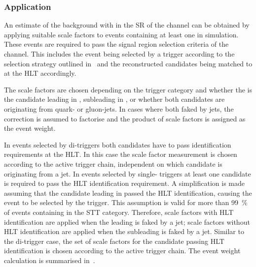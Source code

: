 \subsubsection{Application}

An estimate of the \ttbar background with \faketauhadvis in the SR of
the \hadhad channel can be obtained by applying suitable scale factors
to events containing at least one \faketauhadvis in \ttbar simulation.
These events are required to pass the signal region selection criteria
of the \hadhad channel. This includes the event being selected by a
trigger according to the selection strategy outlined
in~ and the reconstructed \tauhadvis candidates
being matched to \tauhadvis at the HLT accordingly.

The scale factors are chosen depending on the trigger category and
whether the \faketauhadvis is the \tauhadvis candidate leading in \pT,
subleading in \pT, or whether both candidates are originating from
quark- or gluon-jets. In cases where both \tauhadvis faked by jets,
the correction is assumed to factorise and the product of scale
factors is assigned as the event weight.

In events selected by di-\tauhadvis triggers both \tauhadvis
candidates have to pass identification requirements at the HLT. In
this case the scale factor measurement is chosen according to the
active trigger chain, independent on which \tauhadvis candidate is
originating from a jet. In events selected by single-\tauhadvis
triggers at least one \tauhadvis candidate is required to pass the
HLT \tauhadvis identification requirement. A simplification is made
assuming that the \tauhadvis candidate leading in \pT passed the HLT
\tauhadvis identification, causing the event to be selected by the
trigger. This assumption is valid for more than \SI{99}{\percent} of
\ttbar events containing \faketauhadvis in the STT
category. Therefore, scale factors with HLT identification are applied
when the leading \tauhadvis is faked by a jet; scale factors without
HLT identification are applied when the subleading \tauhadvis is faked
by a jet. Similar to the di-\tauhadvis trigger case, the set of scale
factors for the candidate passing HLT identification is chosen
according to the active trigger chain. The event weight calculation is
summarised in~.


